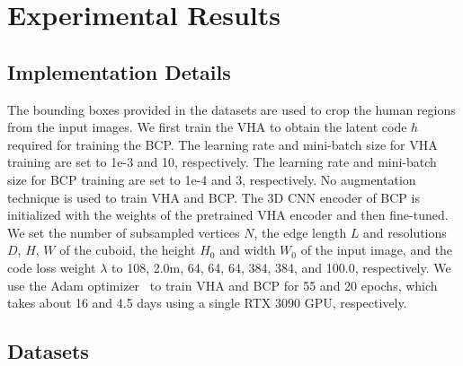 \documentclass{article}
\begin{document}
\section{Experimental Results}
\label{sec:experimental_results}

\subsection{Implementation Details}
\label{ssec:implementation_details}

The bounding boxes provided in the datasets are used to crop the human regions from the input images. We first train the VHA to obtain the latent code $h$ required for training the BCP. The learning rate and mini-batch size for VHA training are set to 1e-3 and 10, respectively. The learning rate and mini-batch size for BCP training are set to 1e-4 and 3, respectively. No augmentation technique is used to train VHA and BCP. The 3D CNN encoder of BCP is initialized with the weights of the pretrained VHA encoder and then fine-tuned. We set the number of subsampled vertices $N$, the edge length $L$ and resolutions $D$, $H$, $W$ of the cuboid, the height $H_0$ and width $W_0$ of the input image, and the code loss weight $\lambda$ to 108, 2.0m, 64, 64, 64, 384, 384, and 100.0, respectively. We use the Adam optimizer~\cite{2015_Kingma} to train VHA and BCP for 55 and 20 epochs, which takes about 16 and 4.5 days using a single RTX 3090 GPU, respectively.


\subsection{Datasets}
\label{ssec:datasets}
\end{document}
